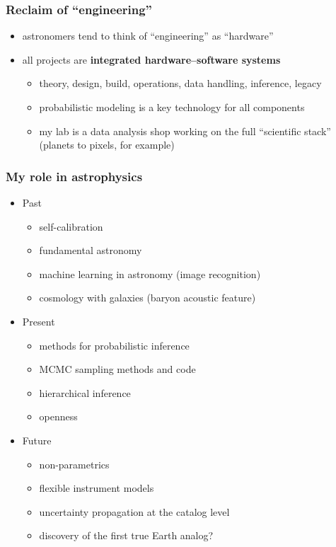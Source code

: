 \documentclass{beamer}
\renewcommand{\emph}[1]{\textbf{#1}}
\begin{document}
\begin{frame}
  \frametitle{Reclaim of ``engineering''}
  \begin{itemize}
  \item astronomers tend to think of ``engineering'' as ``hardware''
  \item all projects are \emph{integrated hardware--software systems}
    \begin{itemize}
    \item theory, design, build, operations, data handling, inference, legacy
    \item probabilistic modeling is a key technology for all components
    \item my lab is a data analysis shop working on the full ``scientific stack'' (planets to pixels, for example)
    \end{itemize}
  \end{itemize}
\end{frame}

\begin{frame}
  \frametitle{My role in astrophysics}
  \begin{itemize}
  \item Past
    \begin{itemize}
    \item self-calibration
    \item fundamental astronomy
    \item machine learning in astronomy (image recognition)
    \item cosmology with galaxies (baryon acoustic feature)
    \end{itemize}
  \item Present
    \begin{itemize}
    \item methods for probabilistic inference
    \item MCMC sampling methods and code
    \item hierarchical inference
    \item openness
    \end{itemize}
  \item Future
    \begin{itemize}
    \item non-parametrics
    \item flexible instrument models
    \item uncertainty propagation at the catalog level
    \item discovery of the first true Earth analog?
    \end{itemize}
  \end{itemize}
\end{frame}
\end{document}
